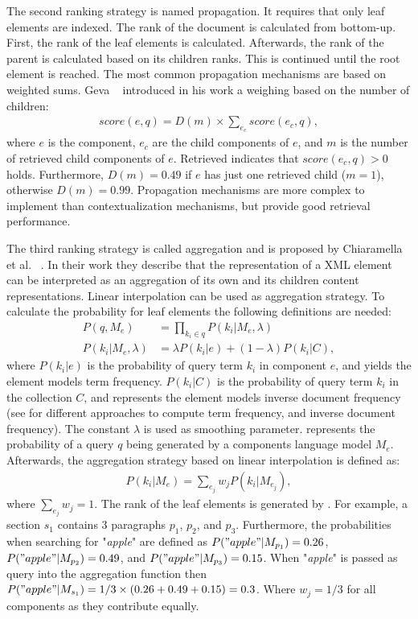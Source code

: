 The second ranking strategy is named propagation. It requires that only leaf elements are indexed. The rank of the document is calculated from bottom-up. First, the rank of the leaf elements is calculated. Afterwards, the rank of the parent is calculated based on its children ranks. This is continued until the root element is reached. The most common propagation mechanisms are based on weighted sums. Geva ~\cite{GS2005} introduced in his work a weighing based on the number of children:
\begin{align}
  \mathit{score}(e, q) = D(m) \times \sum_{e_c} \mathit{score}(e_c, q),
\end{align}
where $e$ is the component, $e_c$ are the child components of $e$, and $m$ is the number of retrieved child components of $e$. Retrieved indicates that $\mathit{score}(e_c, q) > 0$ holds. Furthermore, $D(m) = 0.49$ if $e$ has just one retrieved child ($m = 1$), otherwise $D(m) = 0.99$. Propagation mechanisms are more complex to implement than contextualization mechanisms, but provide good retrieval performance.

The third ranking strategy is called aggregation and is proposed by Chiaramella et al. ~\cite{Yv96}. In their work they describe that the representation of a XML element can be interpreted as an aggregation of its own and its children content representations. Linear interpolation can be used as aggregation strategy. To calculate the probability for leaf elements the following definitions are needed:
\begin{align}
  \label{prob_query_lan_model}
  P(q, M_e) & = \prod_{k_i \in q} P(k_i|M_e, \lambda) \\
  P(k_i|M_e, \lambda) & = \lambda P(k_i|e) + (1 - \lambda) P(k_i|C),
\end{align}
where $P(k_i|e)$ is the probability of query term $k_i$ in component $e$, and yields the element models term frequency. $P(k_i|C)$ is the probability of query term $k_i$ in the collection $C$, and represents the element models inverse document frequency (see  for different approaches to compute term frequency, and inverse document frequency). The constant $\lambda$ is used as smoothing parameter.  represents the probability of a query $q$ being generated by a components language model $M_e$. Afterwards, the aggregation strategy based on linear interpolation is defined as:
\begin{align}
  P(k_i|M_e) = \sum_{e_j} w_j P(k_i|M_{e_{j}}),
\end{align}
where $\sum_{e_j} w_j = 1$. The rank of the leaf elements is generated by . For example, a section $s_1$ contains $3$ paragraphs $p_1$, $p_2$, and $p_3$. Furthermore, the probabilities when searching for "\textit{apple}" are defined as $P("apple"|M_{p_1}) = 0.26$, $P("apple"|M_{p_2}) = 0.49$, and $P("apple"|M_{p_3}) = 0.15$. When "\textit{apple}" is passed as query into the aggregation function then $P("apple"|M_{s_1}) = 1/3 \times (0.26 + 0.49 + 0.15) = 0.3$. Where $w_j = 1/3$ for all components as they contribute equally.

